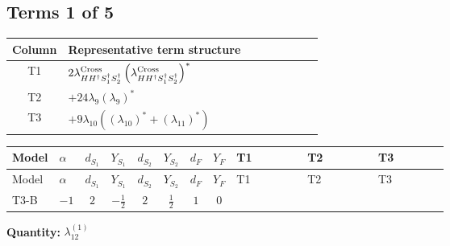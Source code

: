 \documentclass[8pt]{article}
\begin{document}
\begin{landscape}
\subsection*{Terms 1 of 5}
\begin{center}
\begin{tabular}{@{}c >{\raggedright\arraybackslash}p{0.82\linewidth}@{}}
\toprule
Column & Representative term structure \\
\midrule
T1 & \(\displaystyle 2 {\lambda_{H H^\dagger S_1^\dagger S_2^\dagger}^{\rm Cross}} \left({\lambda_{H H^\dagger S_1^\dagger S_2^\dagger}^{\rm Cross}}\right)^{*}\) \\
\midrule
T2 & \(\displaystyle +24 {\lambda_9} \left({\lambda_9}\right)^{*}\) \\
\midrule
T3 & \(\displaystyle +9 {\lambda_{10}} (\left({\lambda_{10}}\right)^{*}+\left({\lambda_{11}}\right)^{*})\) \\
\midrule
\bottomrule
\end{tabular}
\end{center}
\smallskip
\tiny
\begin{longtable}{@{}llcccccc >{\raggedright\arraybackslash}p{0.21\linewidth} >{\raggedright\arraybackslash}p{0.21\linewidth} >{\raggedright\arraybackslash}p{0.21\linewidth}@{}}
\toprule
Model & $\alpha$ & $d_{S_1}$ & $Y_{S_1}$ & $d_{S_2}$ & $Y_{S_2}$ & $d_F$ & $Y_F$ & T1 & T2 & T3 \\
\midrule
\endfirsthead
\toprule
Model & $\alpha$ & $d_{S_1}$ & $Y_{S_1}$ & $d_{S_2}$ & $Y_{S_2}$ & $d_F$ & $Y_F$ & T1 & T2 & T3 \\
\midrule
\endhead
T3-B & $-1$ & $2$ & $-\frac{1}{2}$ & $2$ & $\frac{1}{2}$ & $1$ & $0$ & \scriptsize\adjustbox{max width=\linewidth}{$\begin{gathered} 2 {\lambda_{H H^\dagger S_1^\dagger S_2^\dagger}^{\rm Cross}} \left({\lambda_{H H^\dagger S_1^\dagger S_2^\dagger}^{\rm Cross}}\right)^{*}\end{gathered}$} & \scriptsize\adjustbox{max width=\linewidth}{$\begin{gathered} +24 {\lambda_9} \left({\lambda_9}\right)^{*}\end{gathered}$} & \scriptsize\adjustbox{max width=\linewidth}{$\begin{gathered} +9 {\lambda_{10}} (\left({\lambda_{10}}\right)^{*}+\left({\lambda_{11}}\right)^{*}) \\ +9 {\lambda_{11}} (\left({\lambda_{10}}\right)^{*}+\left({\lambda_{11}}\right)^{*})\end{gathered}$} \\
\midrule
\bottomrule
\end{longtable}
\clearpage
\noindent\textbf{Quantity: }$\lambda_{12}^{(1)}$\par\smallskip

\end{landscape}
\end{document}
